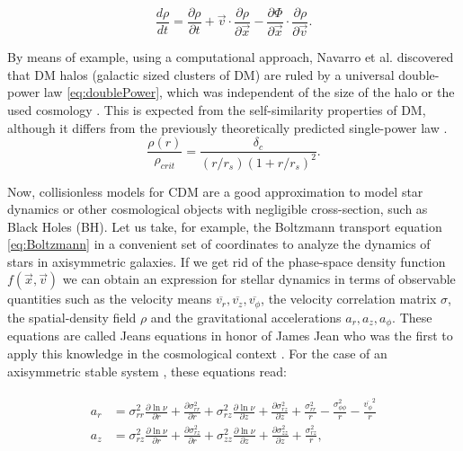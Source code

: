 \begin{equation}
\frac{d\rho}{dt} = \frac{\partial \rho}{\partial t} +\vec{v}\cdot\frac{\partial\rho}{\partial \vec{x}}
-\frac{\partial \Phi}{\partial \vec{x}}\cdot\frac{\partial\rho}{\partial \vec{v}}.
\label{eq:Boltzmann}
\end{equation}

   
By means of example, using a computational approach, Navarro et al. discovered that DM halos (galactic sized clusters of DM) are ruled by a universal double-power law \eqref{eq:doublePower}, which was independent of the size of the halo or the used cosmology \cite{Navarro_et_al._1996,Navarro_et_al._1997,Power_et_al._2003,Navarro_et_al._2010}. This is expected from the self-similarity properties of DM, although it differs from the previously theoretically predicted single-power law  \cite{Gunn_and_Gott_1972,White_and_Zaritsky_1992}.\\

\begin{equation}
\frac{\rho(r)}{\rho_{crit}} = \frac{\delta_c}{(r/r_s)(1+r/r_s)^2}.
\label{eq:doublePower}
\end{equation}

Now, collisionless models for CDM are a good approximation to model star dynamics or other cosmological objects with negligible cross-section, such as Black Holes (BH). Let us take, for example, the Boltzmann transport equation \eqref{eq:Boltzmann} in a convenient set of coordinates to analyze the dynamics of stars in axisymmetric galaxies. If we get rid of the phase-space density function $f(\vec{x},\vec{v})$ we can obtain an expression for stellar dynamics in terms of observable quantities such as the velocity means $\overline{v_r},\overline{v_z},\overline{v_\phi}$, the velocity correlation matrix $\sigma$, the spatial-density field $\rho$ and the gravitational accelerations $a_r,a_z,a_\phi$. These equations are called Jeans equations in honor of James Jean who was the first to apply this knowledge in the cosmological context \cite{Jeans_1915}. For the case of an axisymmetric stable system \cite{Loebman_et_al._2012}, these equations read:  

\begin{align}
\begin{aligned}
a_r & = \sigma^2_{rr} \frac{\partial \ln \nu}{\partial r} + \frac{\partial \sigma^2_{rr} }{\partial r} + \sigma^2_{rz} \frac{\partial \ln \nu}{\partial z} + \frac{\partial \sigma^2_{rz} }{\partial z} +  \frac{\sigma^2_{rr}}{r}-\frac{\sigma^2_{\phi\phi}}{r}-\frac{\overline{v_\phi}^2}{r}\\
a_z & =  \sigma^2_{rz} \frac{\partial \ln \nu}{\partial r} + \frac{\partial \sigma^2_{rz} }{\partial r} + \sigma^2_{zz}\frac{\partial \ln \nu}{\partial z} + \frac{\partial \sigma^2_{zz} }{\partial z} +  \frac{\sigma^2_{rz}}{r},
\end{aligned}
\label{eq:Jeans}
\end{align}

